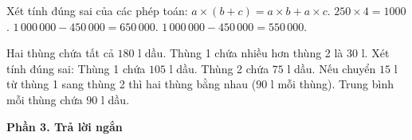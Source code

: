 \begin{ex} %
Xét tính đúng sai của các phép toán:
\choiceTF
{\True $a \times (b + c) = a \times b + a \times c$.}
{\True $250 \times 4 = 1000$.}
{$1\,000\,000 - 450\,000 = 650\,000$.}
{\True $1\,000\,000 - 450\,000 = 550\,000$.}
\end{ex}

\begin{ex} %
Hai thùng chứa tất cả $180\text{ l}$ dầu. Thùng 1 chứa nhiều hơn thùng 2 là $30\text{ l}$. Xét tính đúng sai:
\choiceTF
{\True Thùng 1 chứa $105\text{ l}$ dầu.}
{\True Thùng 2 chứa $75\text{ l}$ dầu.}
{Nếu chuyển $15\text{ l}$ từ thùng 1 sang thùng 2 thì hai thùng bằng nhau ($90\text{ l}$ mỗi thùng).}
{\True Trung bình mỗi thùng chứa $90\text{ l}$ dầu.}
\end{ex}

\textbf{Phần 3. Trả lời ngắn}

